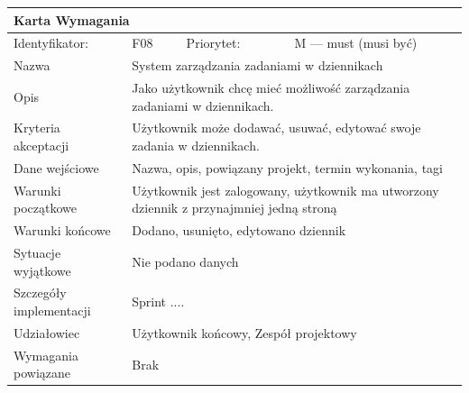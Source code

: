 \documentclass[a4paper,11pt]{report}
\begin{document}
		\begin{tabular}{|p{3cm}|p{2cm}|p{2cm}|p{6cm}|}
		\hline
		\multicolumn{4}{|p{12 cm}|}{Karta Wymagania}\\
		\hline
		Identyfikator: & F08 & Priorytet: & M — must (musi być)\\
		\hline
		Nazwa & \multicolumn{3}{|p{10 cm}|}{System zarządzania zadaniami w dziennikach}\\
		\hline
		Opis & \multicolumn{3}{|p{10 cm}|}{Jako użytkownik chcę mieć możliwość zarządzania zadaniami w dziennikach.}\\
		\hline
		Kryteria akceptacji & \multicolumn{3}{|p{10 cm}|}{Użytkownik może dodawać, usuwać, edytować swoje zadania w dziennikach.}\\
		\hline
		Dane wejściowe & \multicolumn{3}{|p{10 cm}|}{Nazwa, opis, powiązany projekt, termin wykonania, tagi}\\
		\hline
		Warunki początkowe & \multicolumn{3}{|p{10 cm}|}{Użytkownik jest zalogowany, użytkownik ma utworzony dziennik z przynajmniej jedną stroną}\\
		\hline
		Warunki końcowe & \multicolumn{3}{|p{10 cm}|}{Dodano, usunięto, edytowano dziennik}\\
		\hline
		Sytuacje wyjątkowe & \multicolumn{3}{|p{10 cm}|}{Nie podano danych}\\
		\hline
		Szczegóły implementacji & \multicolumn{3}{|p{10 cm}|}{Sprint ....}\\
		\hline
		Udziałowiec & \multicolumn{3}{|p{10 cm}|}{Użytkownik końcowy, Zespół projektowy}\\
		\hline
		Wymagania powiązane & \multicolumn{3}{|p{10 cm}|}{Brak}\\
		\hline
		\end{tabular}\\
		\newline
		\vspace*{0,2 cm}
		\newline
\end{document}
